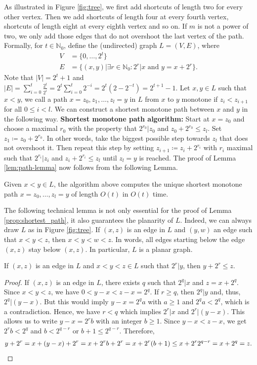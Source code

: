 As illustrated in Figure \ref{fig:tree}, we first add shortcuts of length two for every other vertex. Then we add shortcuts of length four at every fourth vertex, shortcuts of length eight at every eighth vertex and so on. If $m$ is not a power of two, we only add those edges that do not overshoot the last vertex of the path. Formally, for $t\in \mathbb{N}_0$, define the (undirected) graph $L=(V,E)$, where
\begin{equation*}
\begin{aligned}
V&=\{0,\ldots,2^t\} \\ 
E&=\{(x,y)\vert\exists r\in\mathbb{N}_0\colon 2^r\vert x\text{ and } y=x+2^r\}.
\end{aligned}
\end{equation*}
Note that $\vert V\vert=2^t+1$ and $\vert E\vert=\sum_{i=0}^t \frac{2^t}{2^i}=2^t \sum_{i=0}^t 2^{-i}=2^t(2-2^{-t})=2^{t+1}-1$.
%
Let $x,y\in L$ such that $x<y$, we call a path $x=z_0,z_1,\ldots,z_l=y$ in $L$ from $x$ to $y$ monotone if $z_i<z_{i+1}$ for all $0\leq i<l$. We can construct a shortest monotone path between $x$ and $y$ in the following way.
%
\textbf{Shortest monotone path algorithm:} Start at $x=z_0$ and choose a maximal $r_0$ with the property that $2^{r_0}\vert z_0$ and $z_0+2^{r_0}\leq z_l$. Set $z_1\coloneqq z_0+2^{r_0}$. In other words, take the biggest possible step towards $z_l$ that does not overshoot it. Then repeat this step by setting $z_{i+1}\coloneqq z_i+2^{r_i}$ with $r_i$ maximal such that $2^{r_i}\vert z_i$ and $z_i+2^{r_i}\leq z_l$ until $z_l=y$ is reached. 
%
The proof of Lemma \ref{lem:path-lemma} now follows from the following Lemma.
%
\begin{lemma} \label{prop:shortest_path}
Given $x<y\in L$, the algorithm above computes the unique shortest monotone path $x=z_0,\ldots,z_l=y$ of length $O(t)$ in $O(t)$ time.
\end{lemma}
%
The following technical lemma is not only essential for the proof of Lemma \ref{prop:shortest_path}, it also guarantees the planarity of $L$. 
Indeed, we can always draw $L$ as in Figure \ref{fig:tree}. If $(x,z)$ is an edge in $L$ and $(y,w)$ an edge such that $x<y<z$, then $x<y<w<z$. In words, all edges starting below the edge $(x,z)$ stay below $(x,z)$. In particular, $L$ is a planar graph.
%
\begin{lemma} \label{prop:crossing}
If $(x,z)$ is an edge in $L$ and $x<y<z\in L$ such that $2^r\vert y$, then $y+2^r\leq z$.  
\end{lemma}
%
\begin{proof}
If $(x,z)$ is an edge in $L$, there exists $q$ such that $2^q\vert x$ and $z=x+2^q$. Since $x<y<z$, we have $0<y-x<z-x=2^q$. If $r\geq q$, then $2^q\vert y$ and, thus, $2^q\vert(y-x)$. But this would imply $y-x=2^qa$ with $a\geq 1$ and $2^qa<2^q$, which is a contradiction. Hence, we have $r<q$ which implies $2^r\vert x$ and $2^r\vert(y-x)$. This allows us to write $y-x=2^rb$ with an integer $b\geq 1$. Since $y-x<z-x$, we get $2^rb<2^q$ and $b<2^{q-r}$ or $b+1\leq 2^{q-r}$. Therefore,
\begin{equation*}
y+2^r=x+(y-x)+2^r=x+2^rb+2^r=x+2^r(b+1)\leq x+2^r2^{q-r}=x+2^q=z.\qedhere
\end{equation*}
\end{proof}
